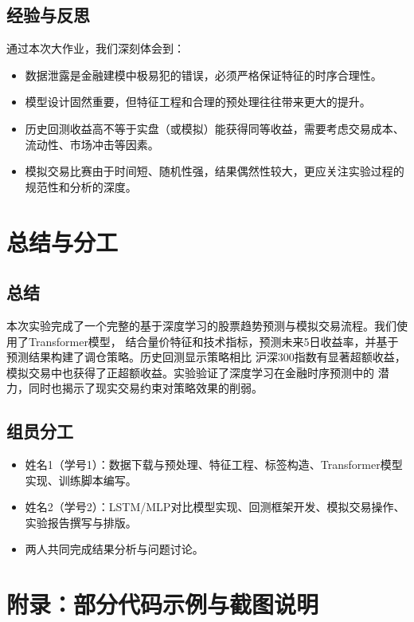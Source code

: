 \documentclass[12pt]{article} %
\begin{document}
\subsection{经验与反思}

通过本次大作业，我们深刻体会到：
\begin{itemize}
    \item 数据泄露是金融建模中极易犯的错误，必须严格保证特征的时序合理性。
    \item 模型设计固然重要，但特征工程和合理的预处理往往带来更大的提升。
    \item 历史回测收益高不等于实盘（或模拟）能获得同等收益，需要考虑交易成本、流动性、市场冲击等因素。
    \item 模拟交易比赛由于时间短、随机性强，结果偶然性较大，更应关注实验过程的规范性和分析的深度。
\end{itemize}

\section{总结与分工}

\subsection{总结}

本次实验完成了一个完整的基于深度学习的股票趋势预测与模拟交易流程。我们使用了Transformer模型，
结合量价特征和技术指标，预测未来5日收益率，并基于预测结果构建了调仓策略。历史回测显示策略相比
沪深300指数有显著超额收益，模拟交易中也获得了正超额收益。实验验证了深度学习在金融时序预测中的
潜力，同时也揭示了现实交易约束对策略效果的削弱。

\subsection{组员分工}

\begin{itemize}
    \item 姓名1（学号1）：数据下载与预处理、特征工程、标签构造、Transformer模型实现、训练脚本编写。
    \item 姓名2（学号2）：LSTM/MLP对比模型实现、回测框架开发、模拟交易操作、实验报告撰写与排版。
    \item 两人共同完成结果分析与问题讨论。
\end{itemize}

\appendix
\section{附录：部分代码示例与截图说明}
\end{document}
